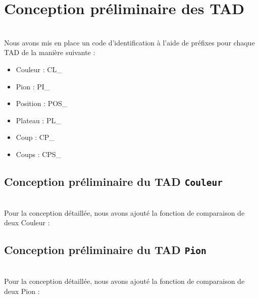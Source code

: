
\chapter{Conception préliminaire des TAD}
~\\
Nous avons mis en place un code d'identification à l'aide de préfixes pour chaque TAD de la manière suivante :
\begin{itemize}
 \item Couleur : CL\_
 \item Pion : PI\_
 \item Position : POS\_
 \item Plateau : PL\_
 \item Coup : CP\_
 \item Coups : CPS\_
\end{itemize}


\section{Conception préliminaire du TAD \tt{Couleur}}
\begin{itemize}
\end{itemize}

~\\
Pour la conception détaillée, nous avons ajouté la fonction de comparaison de deux \og Couleur \fg{}  :
\begin{itemize}
\end{itemize}

\section{Conception préliminaire du TAD \tt{Pion}}
\begin{itemize}
\end{itemize}

~\\
Pour la conception détaillée, nous avons ajouté la fonction de comparaison de deux \og Pion \fg{}  :
\begin{itemize}
\end{itemize}

